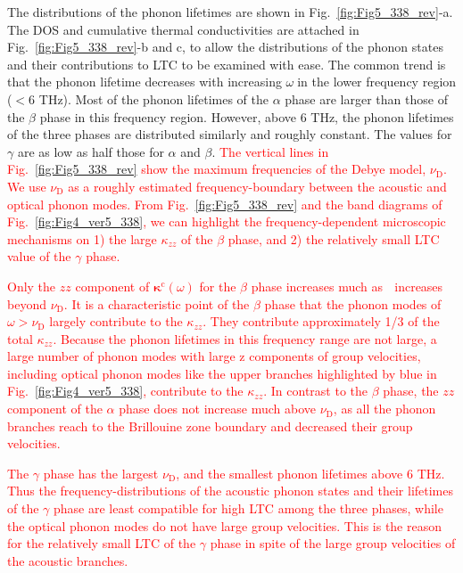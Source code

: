 \documentclass[twocolumn,amsmath,amssymb,a4paper,prb,superscriptaddress,floatfix]{revtex4-1}
\begin{document}
The distributions of the phonon lifetimes are shown in
Fig.~\ref{fig:Fig5_338_rev}-a. The DOS and cumulative thermal
conductivities are attached in Fig.~\ref{fig:Fig5_338_rev}-b and c, to
allow the distributions of the phonon states and their contributions to
LTC to be examined with ease. The common trend is that the phonon
lifetime decreases with increasing $\omega$in the lower frequency
region ($<6$ THz). Most of the phonon lifetimes of the $\alpha$ phase
are larger than those of the $\beta$ phase in this frequency
region. However, above 6 THz, the phonon lifetimes of the three phases
are distributed similarly and roughly constant. The values for $\gamma$
are as low as half those for $\alpha$ and $\beta$.
%
\textcolor{red}{The vertical lines in Fig.~\ref{fig:Fig5_338_rev} show
the maximum frequencies of the Debye model, $\nu_\text{D}$. We use
$\nu_\text{D}$ as a roughly estimated frequency-boundary between the
acoustic and optical phonon modes. From Fig.~\ref{fig:Fig5_338_rev} and
the band diagrams of Fig.~\ref{fig:Fig4_ver5_338}, we can highlight the
frequency-dependent microscopic mechanisms on 1) the large $\kappa_{zz}$
of the $\beta$ phase, and 2) the relatively small LTC value of the
$\gamma$ phase.}

\textcolor{red}{Only the $zz$ component of
$\boldsymbol{\kappa}^\text{c}(\omega)$ for the $\beta$ phase increases
much as  increases beyond $\nu_\text{D}$. It is a characteristic point
of the $\beta$ phase that the phonon modes of $\omega > \nu_\text{D}$
largely contribute to the $\kappa_{zz}$. They contribute approximately
1/3 of the total $\kappa_{zz}$. Because the phonon lifetimes in this
frequency range are not large, a large number of phonon modes with large
z components of group velocities, including optical phonon modes like
the upper branches highlighted by blue in Fig.~\ref{fig:Fig4_ver5_338},
contribute to the $\kappa_{zz}$. In contrast to the $\beta$ phase, the
$zz$ component of the $\alpha$ phase does not increase much above
$\nu_\text{D}$, as all the phonon branches reach to the Brillouine zone
boundary and decreased their group velocities.}

\textcolor{red}{The $\gamma$ phase has the largest $\nu_\text{D}$, and
the smallest phonon lifetimes above 6 THz. Thus the
frequency-distributions of the acoustic phonon states and their
lifetimes of the $\gamma$ phase are least compatible for high LTC among
the three phases, while the optical phonon modes do not have large group
velocities. This is the reason for the relatively small LTC of the
$\gamma$ phase in spite of the large group velocities of the acoustic
branches.}
\end{document}
